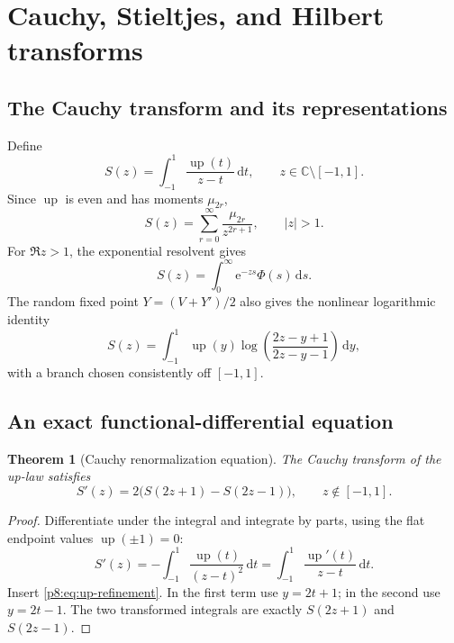 \documentclass[11pt,oneside]{article}
\newtheorem{theorem}{Theorem}[section]
\theoremstyle{definition}
\theoremstyle{remark}
\newcommand{\Up}{\operatorname{up}}
\newcommand{\C}{\mathbb C}
\newcommand{\dd}{\,\mathrm d}
\newcommand{\e}{\mathrm e}
\newcommand{\1}{\mathbf 1}
\begin{document}
\section{Cauchy, Stieltjes, and Hilbert transforms}
\label{p8:sec:cauchy}

\subsection{The Cauchy transform and its representations}

Define
\begin{equation}
 S(z)=\int_{-1}^1\frac{\Up(t)}{z-t}\dd t,
 \qquad z\in\C\setminus[-1,1].
 \label{p8:eq:Cauchy-def}
\end{equation}
Since \(\Up\) is even and has moments \(\mu_{2r}\),
\begin{equation}
 \boxed{
 S(z)=\sum_{r=0}^{\infty}\frac{\mu_{2r}}{z^{2r+1}},
 \qquad |z|>1.}
 \label{p8:eq:Cauchy-moment-series}
\end{equation}
For \(\Re z>1\), the exponential resolvent gives
\begin{equation}
 \boxed{
 S(z)=\int_0^\infty\e^{-zs}\Phi(s)\dd s.}
 \label{p8:eq:Cauchy-Laplace}
\end{equation}
The random fixed point \(Y=(V+Y')/2\) also gives the nonlinear logarithmic
identity
\begin{equation}
 \boxed{
 S(z)=\int_{-1}^1\Up(y)
 \log\!\left(\frac{2z-y+1}{2z-y-1}\right)\dd y,}
 \label{p8:eq:Cauchy-log}
\end{equation}
with a branch chosen consistently off \([-1,1]\).

\subsection{An exact functional-differential equation}

\begin{theorem}[Cauchy renormalization equation]
\label{p8:thm:Cauchy-functional}
The Cauchy transform of the up-law satisfies
\begin{equation}
 \boxed{
 S'(z)=2\bigl(S(2z+1)-S(2z-1)\bigr),
 \qquad z\notin[-1,1].}
 \label{p8:eq:Cauchy-functional}
\end{equation}
\statusprovedPartll
\end{theorem}

\begin{proof}
Differentiate under the integral and integrate by parts, using the flat endpoint
values \(\Up(\pm1)=0\):
\[
 S'(z)=-\int_{-1}^1\frac{\Up(t)}{(z-t)^2}\dd t
 =\int_{-1}^1\frac{\Up'(t)}{z-t}\dd t.
\]
Insert \eqref{p8:eq:up-refinement}.  In the first term use \(y=2t+1\); in the
second use \(y=2t-1\).  The two transformed integrals are exactly
\(S(2z+1)\) and \(S(2z-1)\).
\end{proof}
\end{document}
